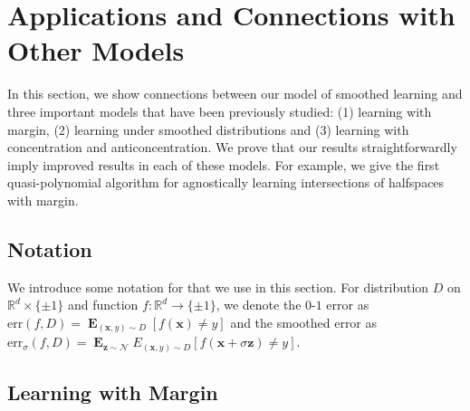 \documentclass[10pt,a4paper]{article}
\renewcommand\vec[1]{\mathbf{#1}}
\DeclareMathOperator*{\E}{\mathbf{E}}
\newcommand{\err}{\mathrm{err}}
\newcommand{\R}{\mathbb{R}}
\newcommand{\1}{\Ind}
\newcommand{\x}{\vec x}
\newcommand{\z}{\vec z}
\newcommand{\Gauss}{\mathcal{N}}
\begin{document}
\section{Applications and Connections with Other Models}
\label{app:applications}
In this section, we show connections between our model of smoothed learning and three important models that have been previously studied: (1) learning with margin, (2) learning under smoothed distributions and (3) learning with concentration and anticoncentration. We prove that our results straightforwardly imply improved results in each of these models. For example, we give the first quasi-polynomial algorithm for agnostically learning intersections of halfspaces with margin. 
\subsection{Notation}
We introduce some notation for that we use in this section. For distribution $D$ on $\R^{d}\times \{\pm 1\}$ and function $f:\R^{d}\to \{\pm 1\}$, we denote the $0$-$1$ error as $\err(f,D)=\E_{(\x,y)\sim D}[f(\x)\neq y]$ and the smoothed error as $\err_{\sigma}(f,D)=\E_{\z\sim \Gauss}E_{(\x,y)\sim D}[f(\x+\sigma\z)\neq y]$. %
\subsection{Learning with Margin}
\label{sec:margin}
\end{document}

